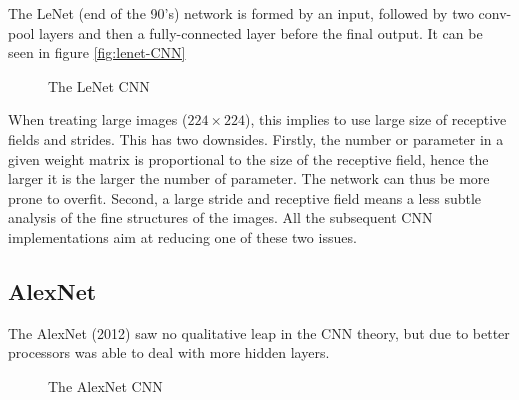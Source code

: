The LeNet\cite{Lecun98gradient-basedlearning} (end of the 90's) network is formed by an input, followed by two conv-pool layers and then a fully-connected layer before the final output. It can be seen in figure \ref{fig:lenet-CNN}
\begin{figure}[H]
\begin{center}
\caption{The LeNet CNN}
\end{center}
\end{figure}

When treating large images ($224\times 224$), this implies to use large size of receptive fields and strides. This has two downsides. Firstly, the number or parameter in a given weight matrix is proportional to the size of the receptive field, hence the larger it is the larger the number of parameter. The network can thus be more prone to overfit. Second, a large stride and receptive field means a less subtle analysis of the fine structures of the images. All the subsequent CNN implementations aim at reducing one of these two issues.

\subsection{AlexNet}

The AlexNet\cite{NIPS2012_4824} (2012) saw no qualitative leap in the CNN theory, but due to better processors was able to deal with more hidden layers.

\begin{figure}[H]
\begin{center}
\caption{The AlexNet CNN}
\end{center}
\end{figure}

